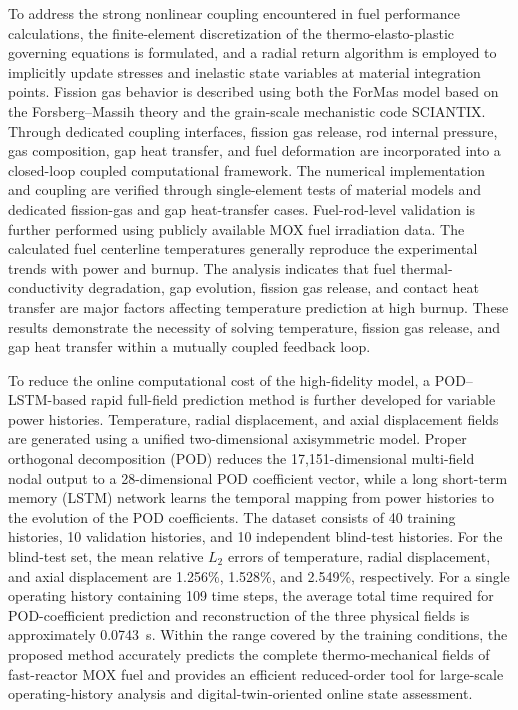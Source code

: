 \begin{englishabstract}
	To address the strong nonlinear coupling encountered in fuel performance calculations, the finite-element discretization of the thermo-elasto-plastic governing equations is formulated, and a radial return algorithm is employed to implicitly update stresses and inelastic state variables at material integration points. Fission gas behavior is described using both the ForMas model based on the Forsberg--Massih theory and the grain-scale mechanistic code SCIANTIX. Through dedicated coupling interfaces, fission gas release, rod internal pressure, gas composition, gap heat transfer, and fuel deformation are incorporated into a closed-loop coupled computational framework. The numerical implementation and coupling are verified through single-element tests of material models and dedicated fission-gas and gap heat-transfer cases. Fuel-rod-level validation is further performed using publicly available MOX fuel irradiation data. The calculated fuel centerline temperatures generally reproduce the experimental trends with power and burnup. The analysis indicates that fuel thermal-conductivity degradation, gap evolution, fission gas release, and contact heat transfer are major factors affecting temperature prediction at high burnup. These results demonstrate the necessity of solving temperature, fission gas release, and gap heat transfer within a mutually coupled feedback loop.
	
	To reduce the online computational cost of the high-fidelity model, a POD--LSTM-based rapid full-field prediction method is further developed for variable power histories. Temperature, radial displacement, and axial displacement fields are generated using a unified two-dimensional axisymmetric model. Proper orthogonal decomposition (POD) reduces the 17,151-dimensional multi-field nodal output to a 28-dimensional POD coefficient vector, while a long short-term memory (LSTM) network learns the temporal mapping from power histories to the evolution of the POD coefficients. The dataset consists of 40 training histories, 10 validation histories, and 10 independent blind-test histories. For the blind-test set, the mean relative $L_2$ errors of temperature, radial displacement, and axial displacement are 1.256\%, 1.528\%, and 2.549\%, respectively. For a single operating history containing 109 time steps, the average total time required for POD-coefficient prediction and reconstruction of the three physical fields is approximately 0.0743~s. Within the range covered by the training conditions, the proposed method accurately predicts the complete thermo-mechanical fields of fast-reactor MOX fuel and provides an efficient reduced-order tool for large-scale operating-history analysis and digital-twin-oriented online state assessment.
	

\end{englishabstract}
